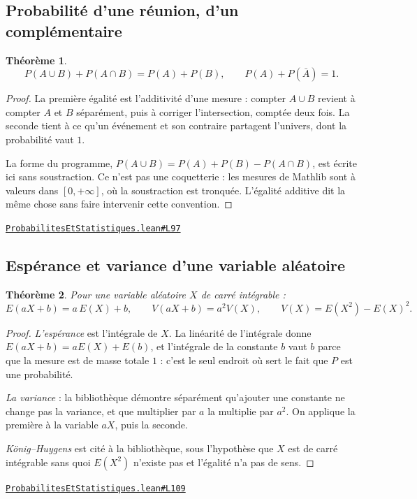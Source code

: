 \documentclass[11pt,a4paper]{article}
\theoremstyle{definition}
\theoremstyle{plain}
\newtheorem{theoreme}{Théorème}
\newcommand{\source}[2]{\par\smallskip\noindent\hfill{\footnotesize\href{#1}{\texttt{#2}}}\par\smallskip}
\begin{document}
\subsection{Probabilité d'une réunion, d'un complémentaire}

\begin{theoreme}
\[ P(A \cup B) + P(A \cap B) = P(A) + P(B) , \qquad P(A) + P(\bar A) = 1 . \]
\end{theoreme}

\begin{proof}
La première égalité est l'additivité d'une mesure : compter $A \cup B$ revient à compter
$A$ et $B$ séparément, puis à corriger l'intersection, comptée deux fois. La seconde tient à
ce qu'un événement et son contraire partagent l'univers, dont la probabilité vaut $1$.

\medskip\noindent
La forme du programme, $P(A \cup B) = P(A) + P(B) - P(A \cap B)$, est écrite ici sans
soustraction. Ce n'est pas une coquetterie : les mesures de Mathlib sont à valeurs dans
$[0, +\infty]$, où la soustraction est tronquée. L'égalité additive dit la même chose sans
faire intervenir cette convention.
\end{proof}
\source{https://github.com/Commutator-IO/learn-lean/blob/main/courses/02-lycee/09-probabilites-et-statistiques/ProbabilitesEtStatistiques.lean\#L97}{ProbabilitesEtStatistiques.lean\#L97}

\subsection{Espérance et variance d'une variable aléatoire}

\begin{theoreme}
Pour une variable aléatoire $X$ de carré intégrable :
\[ E(aX + b) = a\,E(X) + b , \qquad V(aX + b) = a^{2}V(X) , \qquad
   V(X) = E(X^{2}) - E(X)^{2} . \]
\end{theoreme}

\begin{proof}
\emph{L'espérance} est l'intégrale de $X$. La linéarité de l'intégrale donne
$E(aX + b) = a E(X) + E(b)$, et l'intégrale de la constante $b$ vaut $b$ parce que la
mesure est de masse totale $1$ : c'est le seul endroit où sert le fait que $P$ est une
probabilité.

\emph{La variance} : la bibliothèque démontre séparément qu'ajouter une constante ne change
pas la variance, et que multiplier par $a$ la multiplie par $a^{2}$. On applique la
première à la variable $aX$, puis la seconde.

\emph{König--Huygens} est cité à la bibliothèque, sous l'hypothèse que $X$ est de carré
intégrable \textemdash{} sans quoi $E(X^{2})$ n'existe pas et l'égalité n'a pas de sens.
\end{proof}
\source{https://github.com/Commutator-IO/learn-lean/blob/main/courses/02-lycee/09-probabilites-et-statistiques/ProbabilitesEtStatistiques.lean\#L109}{ProbabilitesEtStatistiques.lean\#L109}
\end{document}
